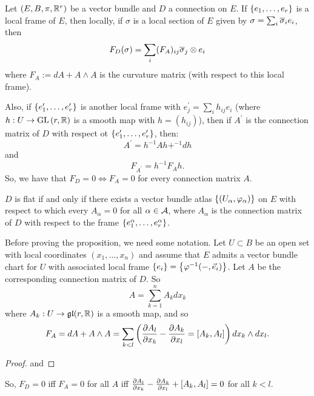 \documentclass[main.tex]{subfiles}
\begin{document}
Let $(E, B, \pi, \mathbb{R}^r)$ be a vector bundle and $D$ a connection on $E$. If $\left\{e_1,\dots, e_r\right\}$ is a local frame of $E$, then locally, if $\sigma$ is a local section of $E$ given by $\sigma = \sum_i \overline{\sigma}_i e_i$, then
\[
F_D(\sigma) = \sum_i (F_A)_{ij} \overline{\sigma}_j \otimes e_i
\]
where $F_A := d A + A \wedge A$ is the curvature matrix (with respect to this local frame).

Also, if $\left\{e_1^\prime, \dots, e_r^\prime\right\}$ is another local frame with $e_j^\prime = \sum_i h_{ij} e_i$ (where $h: U \to \text{GL}\left( r, \mathbb{R} \right)$ is a smooth map with $h = (h_{ij})$), then if $A^\prime$ is the connection matrix of $D$ with respect ot $\left\{e_1^\prime, \dots, e_r^\prime\right\}$, then:
\[
A^\prime = h^{-1} A h + ^{-1} d h
\] and
\[
  F_{A^\prime} = h^{-1} F_A h.
\]
So, we have that $F_D = 0 \iff F_A = 0$ for every connection matrix $A$.

\begin{prop}
    $D$ is flat if and only if there exists a vector bundle atlas $\left\{\left(  U_\alpha, \varphi_\alpha \right)\right\}$ on $E$ with respect to which every $A_\alpha = 0$ for all $\alpha \in \mathcal{A}$, where $A_\alpha$ is the connection matrix of $D$ with respect to the frame $\left\{ e_1^{\alpha}, \dots, e_r^\alpha \right\}$.
\end{prop}

Before proving the proposition, we need some notation. Let $U \subset B$ be an open set with local coordinates $(x_1, \dots, x_n)$ and assume that $E$ admits a vector bundle chart for $U$ with associated local frame $\left\{e_i\right\} = \left\{\varphi^{-1}(-, \vec{e}_i)\right\}$. Let $A$ be the corresponding connection matrix of $D$. So
\[
A = \sum_{k=1}^n A_k dx_k
\]
where $A_k: U \to \mathfrak{gl}(r, \mathbb{R})$ is a smooth map, and so
\[
F_A = dA + A \wedge A = \sum_{k < l} \left(  \frac{ \partial A_l }{ \partial x_k } - \frac{ \partial  A_k }{ \partial x_l } = [A_k, A_l] \right)dx_k \wedge dx_l.
\]

\begin{proof}
      and
\end{proof}
So, $F_D = 0$ iff $F_A = 0$ for all $A$ iff $\frac{ \partial A_l }{ \partial x_k } - \frac{ \partial A_k }{ \partial x_l } + [A_k, A_l] = 0$ for all $k < l$.
\end{document}

